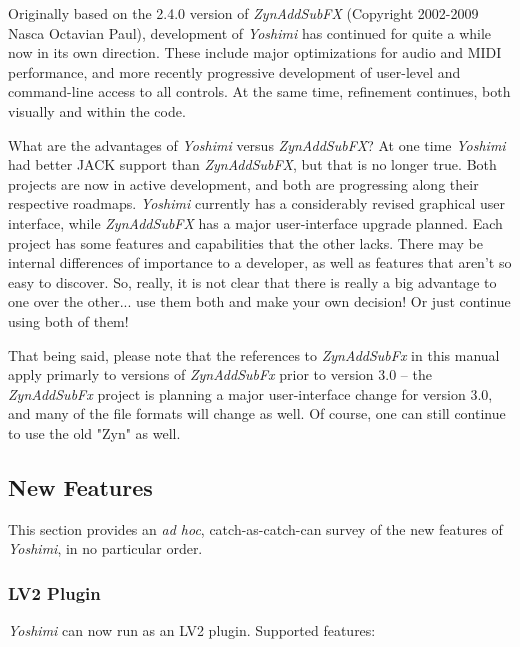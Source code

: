 \documentclass[
 11pt,
 twoside,
 a4paper,
 final                                 %
]{article}
\begin{document}
   Originally based on the 2.4.0 version of \textsl{ZynAddSubFX} (Copyright
   2002-2009 Nasca Octavian Paul), development of \textsl{Yoshimi} has
   continued for quite a while now in its own direction. These include
   major optimizations for audio and MIDI performance, and more recently
   progressive development of user-level and command-line access to all
   controls. At the same time, refinement continues, both visually and within
   the code.

   What are the advantages of
   \textsl{Yoshimi} versus \textsl{ZynAddSubFX}?
   At one time \textsl{Yoshimi} had better JACK support
   than \textsl{ZynAddSubFX}, but that is no longer true.
   Both projects are now in active development, and both are
   progressing along their respective roadmaps.
   \textsl{Yoshimi} currently has a considerably
   revised graphical user interface,
   while \textsl{ZynAddSubFX} has a major user-interface upgrade planned.
   Each project has some features and capabilities that the other lacks.
   There may be internal differences of importance to
   a developer, as well as features that aren't so easy to discover.  So,
   really, it is not clear that there is really a big advantage to one over the
   other... use them both and make your own decision!  Or just continue using
   both of them!

   That being said, please note that the references to \textsl{ZynAddSubFx}
   in this manual apply primarly to versions of \textsl{ZynAddSubFx}
   prior to version 3.0 -- the \textsl{ZynAddSubFx} project is planning
   a major user-interface change for version 3.0, and many of the file formats
   will change as well.  Of course, one can still continue to use the old
   "Zyn" as well.

\subsection{New Features}
\label{subsec:introduction_new_features}

   This section provides an \textsl{ad hoc}, catch-as-catch-can survey of the
   new features of \textsl{Yoshimi}, in no particular order.

\subsubsection{LV2 Plugin}
\label{subsubsec:new_features_lv2_plugin}

   \textsl{Yoshimi} can now run as an LV2 plugin.  Supported features:
\end{document}
